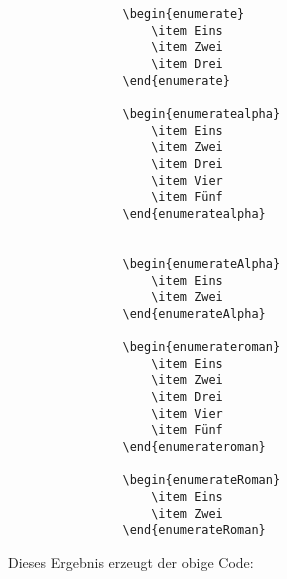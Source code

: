 			\begin{verbatim}
				\begin{enumerate}
					\item Eins
					\item Zwei
					\item Drei
				\end{enumerate}

				\begin{enumeratealpha}
					\item Eins
					\item Zwei
					\item Drei
					\item Vier
					\item Fünf
				\end{enumeratealpha}


				\begin{enumerateAlpha}
					\item Eins
					\item Zwei
				\end{enumerateAlpha}

				\begin{enumerateroman}
					\item Eins
					\item Zwei
					\item Drei
					\item Vier
					\item Fünf
				\end{enumerateroman}

				\begin{enumerateRoman}
					\item Eins
					\item Zwei
				\end{enumerateRoman}
			\end{verbatim}\newline

			Dieses Ergebnis erzeugt der obige Code: \newline

			\newline

